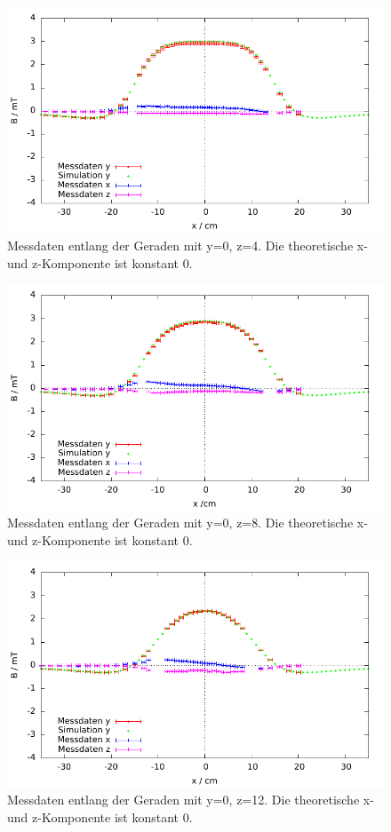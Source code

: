 \documentclass[12pt,a4paper]{article}
\begin{document}
\begin{figure}[H]
	\centering
	\includegraphics[scale=1]{abs1_Auswertung_parallel_2}
	\caption{Messdaten entlang der Geraden mit y=0, z=4. Die theoretische x- und z-Komponente ist konstant 0.}
	\label{fig:p2}
\end{figure}
\begin{figure}[H]
	\centering
	\includegraphics[scale=1]{abs1_Auswertung_parallel_3}
	\caption{Messdaten entlang der Geraden mit y=0, z=8. Die theoretische x- und z-Komponente ist konstant 0.}
	\label{fig:p3}
\end{figure}
\begin{figure}[H]
	\centering
	\includegraphics[scale=1]{abs1_Auswertung_parallel_4}
	\caption{Messdaten entlang der Geraden mit y=0, z=12. Die theoretische x- und z-Komponente ist konstant 0.}
	\label{fig:p4}
\end{figure}
\end{document}
